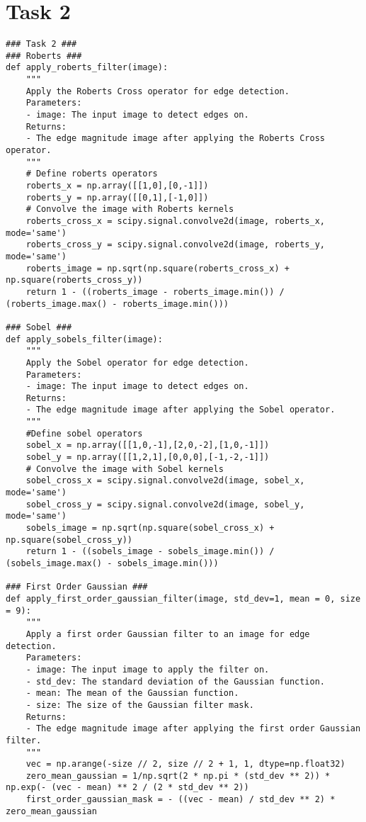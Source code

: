 \documentclass[11pt]{article}
\begin{document}
\section*{Task 2}

\begin{lstlisting}
### Task 2 ###
### Roberts ###
def apply_roberts_filter(image):
    """
    Apply the Roberts Cross operator for edge detection.
    Parameters:
    - image: The input image to detect edges on.
    Returns:
    - The edge magnitude image after applying the Roberts Cross operator.
    """
    # Define roberts operators
    roberts_x = np.array([[1,0],[0,-1]])
    roberts_y = np.array([[0,1],[-1,0]])
    # Convolve the image with Roberts kernels
    roberts_cross_x = scipy.signal.convolve2d(image, roberts_x, mode='same')
    roberts_cross_y = scipy.signal.convolve2d(image, roberts_y, mode='same')
    roberts_image = np.sqrt(np.square(roberts_cross_x) + np.square(roberts_cross_y))
    return 1 - ((roberts_image - roberts_image.min()) / (roberts_image.max() - roberts_image.min()))

### Sobel ###
def apply_sobels_filter(image):
    """
    Apply the Sobel operator for edge detection.
    Parameters:
    - image: The input image to detect edges on.
    Returns:
    - The edge magnitude image after applying the Sobel operator.
    """
    #Define sobel operators
    sobel_x = np.array([[1,0,-1],[2,0,-2],[1,0,-1]])
    sobel_y = np.array([[1,2,1],[0,0,0],[-1,-2,-1]])
    # Convolve the image with Sobel kernels
    sobel_cross_x = scipy.signal.convolve2d(image, sobel_x, mode='same')
    sobel_cross_y = scipy.signal.convolve2d(image, sobel_y, mode='same')
    sobels_image = np.sqrt(np.square(sobel_cross_x) + np.square(sobel_cross_y))
    return 1 - ((sobels_image - sobels_image.min()) / (sobels_image.max() - sobels_image.min()))

### First Order Gaussian ###
def apply_first_order_gaussian_filter(image, std_dev=1, mean = 0, size = 9):
    """
    Apply a first order Gaussian filter to an image for edge detection.
    Parameters:
    - image: The input image to apply the filter on.
    - std_dev: The standard deviation of the Gaussian function.
    - mean: The mean of the Gaussian function.
    - size: The size of the Gaussian filter mask.
    Returns:
    - The edge magnitude image after applying the first order Gaussian filter.
    """
    vec = np.arange(-size // 2, size // 2 + 1, 1, dtype=np.float32)
    zero_mean_gaussian = 1/np.sqrt(2 * np.pi * (std_dev ** 2)) * np.exp(- (vec - mean) ** 2 / (2 * std_dev ** 2))
    first_order_gaussian_mask = - ((vec - mean) / std_dev ** 2) * zero_mean_gaussian


\end{lstlisting}
\end{document}
